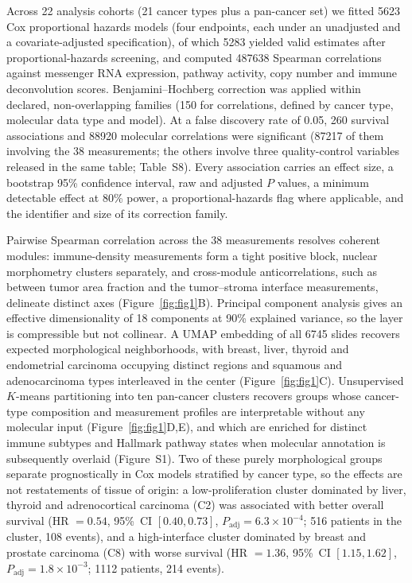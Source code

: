 Across 22 analysis cohorts (21 cancer types
plus a pan-cancer set) we fitted \num{5623} Cox proportional hazards models
(four endpoints, each under an unadjusted and a covariate-adjusted
specification), of which \num{5283} yielded valid estimates after
proportional-hazards screening, and computed \num{487638} Spearman correlations
against messenger RNA expression, pathway activity, copy number and immune
deconvolution scores. Benjamini--Hochberg correction was applied within declared,
non-overlapping families (150 for correlations, defined by cancer type, molecular
data type and model). At a false discovery rate of 0.05, 260 survival
associations and \num{88920} molecular correlations were significant
(\num{87217} of them involving the 38 measurements; the others involve three
quality-control variables released in the same table; Table~S8). Every association carries an effect size, a bootstrap 95\% confidence
interval, raw and adjusted $P$ values, a minimum detectable effect at 80\% power,
a proportional-hazards flag where applicable, and the identifier and size of its
correction family.

Pairwise Spearman
correlation across the 38 measurements resolves coherent modules: immune-density
measurements form a tight positive block, nuclear morphometry clusters
separately, and cross-module anticorrelations, such as between tumor area
fraction and the tumor--stroma interface measurements, delineate distinct axes
(Figure~\ref{fig:fig1}B). Principal component analysis gives an effective
dimensionality of 18 components at 90\% explained variance, so the layer is
compressible but not collinear. A UMAP embedding of all \num{6745} slides
recovers expected morphological neighborhoods, with breast, liver, thyroid and
endometrial carcinoma occupying distinct regions and squamous and adenocarcinoma
types interleaved in the center (Figure~\ref{fig:fig1}C). Unsupervised $K$-means
partitioning into ten pan-cancer clusters recovers groups whose cancer-type
composition and measurement profiles are interpretable without any molecular
input (Figure~\ref{fig:fig1}D,E), and which are enriched for distinct immune
subtypes and Hallmark pathway states when molecular annotation is subsequently
overlaid (Figure~S1). Two of these purely morphological groups separate
prognostically in Cox models stratified by cancer type, so the effects are not
restatements of tissue of origin: a low-proliferation cluster dominated by liver,
thyroid and adrenocortical carcinoma (C2) was associated with better overall
survival (HR $= 0.54$, 95\%~CI $[0.40, 0.73]$, $P_{\mathrm{adj}} = 6.3 \times
10^{-4}$; 516 patients in the cluster, 108 events), and a high-interface cluster
dominated by breast and prostate carcinoma (C8) with worse survival (HR $= 1.36$,
95\%~CI $[1.15, 1.62]$, $P_{\mathrm{adj}} = 1.8 \times 10^{-3}$; \num{1112}
patients, 214 events).

